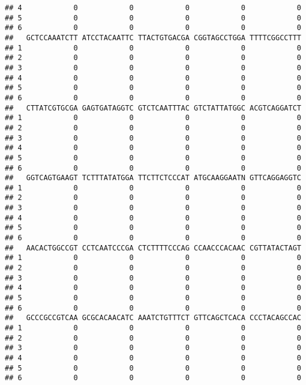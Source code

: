 \documentclass[]{article}
\begin{document}
\begin{verbatim}
## 4            0            0            0            0            0
## 5            0            0            0            0            0
## 6            0            0            0            0            0
##   GCTCCAAATCTT ATCCTACAATTC TTACTGTGACGA CGGTAGCCTGGA TTTTCGGCCTTT
## 1            0            0            0            0            0
## 2            0            0            0            0            0
## 3            0            0            0            0            0
## 4            0            0            0            0            0
## 5            0            0            0            0            0
## 6            0            0            0            0            0
##   CTTATCGTGCGA GAGTGATAGGTC GTCTCAATTTAC GTCTATTATGGC ACGTCAGGATCT
## 1            0            0            0            0            0
## 2            0            0            0            0            0
## 3            0            0            0            0            0
## 4            0            0            0            0            0
## 5            0            0            0            0            0
## 6            0            0            0            0            0
##   GGTCAGTGAAGT TCTTTATATGGA TTCTTCTCCCAT ATGCAAGGAATN GTTCAGGAGGTC
## 1            0            0            0            0            0
## 2            0            0            0            0            0
## 3            0            0            0            0            0
## 4            0            0            0            0            0
## 5            0            0            0            0            0
## 6            0            0            0            0            0
##   AACACTGGCCGT CCTCAATCCCGA CTCTTTTCCCAG CCAACCCACAAC CGTTATACTAGT
## 1            0            0            0            0            0
## 2            0            0            0            0            0
## 3            0            0            0            0            0
## 4            0            0            0            0            0
## 5            0            0            0            0            0
## 6            0            0            0            0            0
##   GCCCGCCGTCAA GCGCACAACATC AAATCTGTTTCT GTTCAGCTCACA CCCTACAGCCAC
## 1            0            0            0            0            0
## 2            0            0            0            0            0
## 3            0            0            0            0            0
## 4            0            0            0            0            0
## 5            0            0            0            0            0
## 6            0            0            0            0            0

\end{verbatim}
\end{document}
